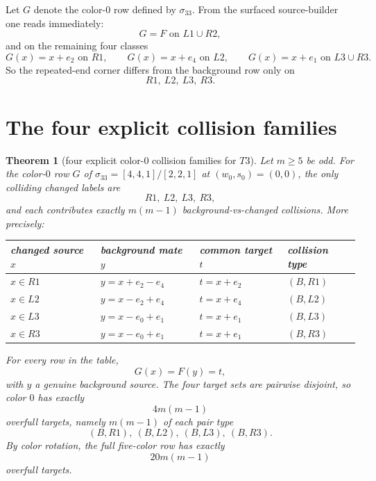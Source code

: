 \documentclass[11pt]{article}
\newtheorem{theorem}{Theorem}
\newcommand{\eX}{e_0}
\newcommand{\eQ}{e_1}
\newcommand{\eW}{e_2}
\newcommand{\eU}{e_4}
\begin{document}
Let $G$ denote the color-$0$ row defined by $\sigma_{33}$.
From the surfaced source-builder one reads immediately:
\[
G=F\text{ on }L1\cup R2,
\]
and on the remaining four classes
\[
G(x)=x+\eW\text{ on }R1,
\qquad
G(x)=x+\eU\text{ on }L2,
\qquad
G(x)=x+\eQ\text{ on }L3\cup R3.
\]
So the repeated-end corner differs from the background row only on
\[
R1,\ L2,\ L3,\ R3.
\]

\section*{The four explicit collision families}

\begin{theorem}[four explicit color-$0$ collision families for $T3$]
\label{thm:T3-four-families}
Let $m\ge 5$ be odd.
For the color-$0$ row $G$ of $\sigma_{33}=[4,4,1]/[2,2,1]$ at $(w_0,s_0)=(0,0)$,
the only colliding changed labels are
\[
R1,\ L2,\ L3,\ R3,
\]
and each contributes exactly $m(m-1)$ background-vs-changed collisions.
More precisely:
\begin{center}
\begin{tabular}{@{}llll@{}}
\toprule
changed source $x$ & background mate $y$ & common target $t$ & collision type \\
\midrule
$x\in R1$ & $y=x+\eW-\eU$ & $t=x+\eW$ & $(B,R1)$ \\
$x\in L2$ & $y=x-\eW+\eU$ & $t=x+\eU$ & $(B,L2)$ \\
$x\in L3$ & $y=x-\eX+\eQ$ & $t=x+\eQ$ & $(B,L3)$ \\
$x\in R3$ & $y=x-\eX+\eQ$ & $t=x+\eQ$ & $(B,R3)$ \\
\bottomrule
\end{tabular}
\end{center}
For every row in the table,
\[
G(x)=F(y)=t,
\]
with $y$ a genuine background source.
The four target sets are pairwise disjoint, so color $0$ has exactly
\[
4m(m-1)
\]
overfull targets, namely $m(m-1)$ of each pair type
\[
(B,R1),\ (B,L2),\ (B,L3),\ (B,R3).
\]
By color rotation, the full five-color row has exactly
\[
20m(m-1)
\]
overfull targets.
\end{theorem}
\end{document}
